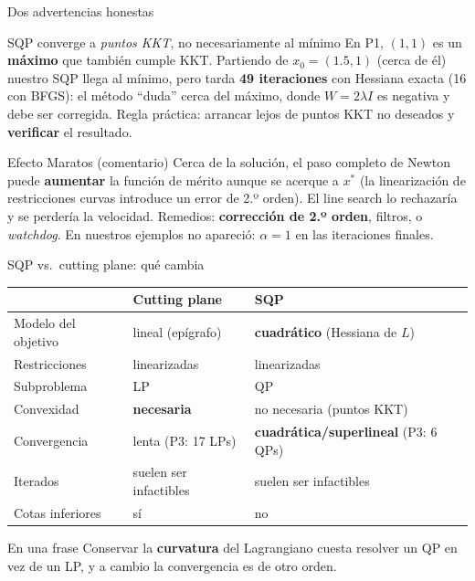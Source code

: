 \documentclass[aspectratio=169]{beamer}
\newcommand{\xs}{x^\ast}
\begin{document}
\begin{frame}{Dos advertencias honestas}
  \begin{alertblock}{SQP converge a \emph{puntos KKT}, no necesariamente al mínimo}
    En P1, $(1,1)$ es un \textbf{máximo} que también cumple KKT. Partiendo de $x_0=(1.5,1)$ (cerca de él) nuestro SQP llega al mínimo, pero tarda \textbf{49 iteraciones} con Hessiana exacta (16 con BFGS): el método ``duda'' cerca del máximo, donde $W=2\lambda I$ es negativa y debe ser corregida. Regla práctica: arrancar lejos de puntos KKT no deseados y \textbf{verificar} el resultado.
  \end{alertblock}
  \begin{alertblock}{Efecto Maratos (comentario)}
    Cerca de la solución, el paso completo de Newton puede \textbf{aumentar} la función de mérito aunque se acerque a $\xs$ (la linearización de restricciones curvas introduce un error de 2.º orden). El line search lo rechazaría y se perdería la velocidad. Remedios: \textbf{corrección de 2.º orden}, filtros, o \emph{watchdog}. En nuestros ejemplos no apareció: $\alpha=1$ en las iteraciones finales.
  \end{alertblock}
\end{frame}

\begin{frame}{SQP vs.\ cutting plane: qué cambia}
  \centering\small
  \begin{tabular}{p{3.4cm}p{4.2cm}p{4.2cm}}
    \toprule
    & \textbf{Cutting plane} & \textbf{SQP}\\
    \midrule
    Modelo del objetivo & lineal (epígrafo) & \textbf{cuadrático} (Hessiana de $L$)\\
    Restricciones & linearizadas & linearizadas\\
    Subproblema & LP & QP\\
    Convexidad & \textbf{necesaria} & no necesaria (puntos KKT)\\
    Convergencia & lenta (P3: 17 LPs) & \textbf{cuadrática/superlineal} (P3: 6 QPs)\\
    Iterados & suelen ser infactibles & suelen ser infactibles\\
    Cotas inferiores & sí & no\\
    \bottomrule
  \end{tabular}
  \vspace{0.3cm}

  \normalsize
  \begin{alertblock}{En una frase}
    Conservar la \textbf{curvatura} del Lagrangiano cuesta resolver un QP en vez de un LP, y a cambio la convergencia es de otro orden.
  \end{alertblock}
\end{frame}
\end{document}

